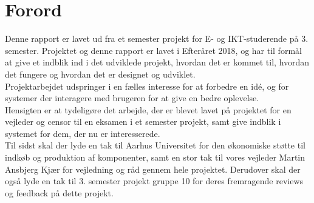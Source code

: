 \documentclass[Rapport/Rapport_main.tex]{subfiles}
\begin{document}
\section{Forord}
Denne rapport er lavet ud fra et semester projekt for E- og IKT-studerende på 3. semester. Projektet og denne rapport er lavet i Efteråret 2018, og har til formål at give et indblik ind i det udviklede projekt, hvordan det er kommet til, hvordan det fungere og hvordan det er designet og udviklet. 
\\Projektarbejdet udspringer i en fælles interesse for at forbedre en idé, og for systemer der interagere med brugeren for at give en bedre oplevelse.  
\\Hensigten er at tydeligøre det arbejde, der er blevet lavet på projektet for en vejleder og censor til en eksamen i et semester projekt, samt give indblik i systemet for dem, der nu er interesserede.
\\Til sidst skal der lyde en tak til Aarhus Universitet for den økonomiske støtte til indkøb og produktion af komponenter, samt en stor tak til vores vejleder Martin Ansbjerg Kjær for vejledning og råd gennem hele projektet. Derudover skal der også lyde en tak til 3. semester projekt gruppe 10 for deres fremragende reviews og feedback på dette projekt.
\end{document}
